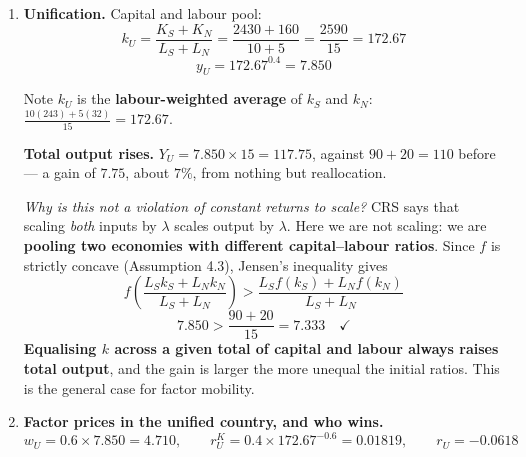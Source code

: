 \documentclass[12pt, letterpaper]{article}
\begin{document}
\begin{tcolorbox}[oddbox,title={Problem 4.3 \quad Korean Unification}]
\begin{enumerate}
\textbf{Southern workers earn $2.25\times$ Northern workers; Northern capital earns
$3.4\times$ Southern capital.} That is the whole economics of the problem: each factor is
better paid where it is scarcer.

\begin{tcolorbox}[databox,title={Both interest rates are negative --- say so}]
$r_S = -6.52\%$ and $r_N = -3.00\%$. This is a property of the numbers the problem chose, not
an error: $\delta = 0.08$ exceeds the marginal product of capital in \emph{both} economies.
Economically it means both are over-capitalised --- they hold more capital than is worth
maintaining, and are dynamically inefficient in the sense of \S4.3. Neither would be in a
steady state with a sensible saving rate. Flag this rather than quietly reporting a negative
number.
\end{tcolorbox}

\item \textbf{Unification.} Capital and labour pool:
$$k_U = \frac{K_S + K_N}{L_S + L_N} = \frac{2430 + 160}{10 + 5} = \frac{2590}{15}
= \boxed{172.67}$$
$$y_U = 172.67^{0.4} = \boxed{7.850}$$
\checkmark

Note $k_U$ is the \textbf{labour-weighted average} of $k_S$ and $k_N$:
$\frac{10(243) + 5(32)}{15} = 172.67$. \checkmark

\textbf{Total output rises.} $Y_U = 7.850 \times 15 = 117.75$, against $90 + 20 = 110$
before --- a gain of $7.75$, about $7\%$, from nothing but reallocation.

\emph{Why is this not a violation of constant returns to scale?} CRS says that scaling
\emph{both} inputs by $\lambda$ scales output by $\lambda$. Here we are not scaling: we are
\textbf{pooling two economies with different capital--labour ratios}. Since $f$ is strictly
concave (Assumption 4.3), Jensen's inequality gives
$$f\!\left(\frac{L_S k_S + L_N k_N}{L_S+L_N}\right) > \frac{L_S f(k_S) + L_N f(k_N)}{L_S+L_N}$$
$$7.850 > \frac{90+20}{15} = 7.333 \quad\checkmark$$
\textbf{Equalising $k$ across a given total of capital and labour always raises total
output}, and the gain is larger the more unequal the initial ratios. This is the general case
for factor mobility.

\item \textbf{Factor prices in the unified country, and who wins.}
$$w_U = 0.6 \times 7.850 = \boxed{4.710}, \qquad
r^K_U = 0.4 \times 172.67^{-0.6} = \boxed{0.01819}, \qquad r_U = \boxed{-0.0618}$$
\checkmark


\end{enumerate}
\end{tcolorbox}
\end{document}
